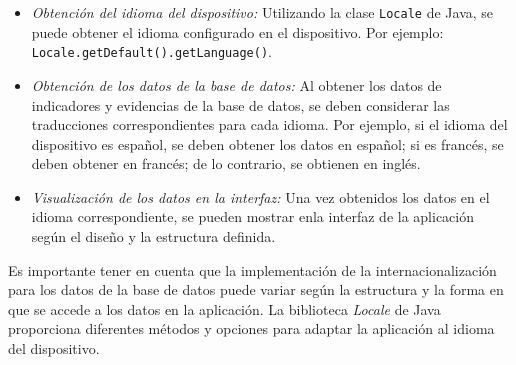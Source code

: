 \begin{itemize}
\begin{itemize}
    \item \textit{Obtención del idioma del dispositivo:} Utilizando la clase \texttt{Locale} de
    Java, se puede obtener el idioma configurado en el dispositivo. Por ejemplo:
    \texttt{Locale.getDefault().getLanguage()}.
    \item \textit{Obtención de los datos de la base de datos:} Al obtener los
    datos de indicadores y evidencias de la base de datos, se deben considerar
    las traducciones correspondientes para cada idioma. Por ejemplo, si el
    idioma del dispositivo es español, se deben obtener los datos en español; si
    es francés, se deben obtener en francés; de lo contrario, se obtienen en
    inglés.
    \item \textit{Visualización de los datos en la interfaz:} Una vez obtenidos
    los datos en el idioma correspondiente, se pueden mostrar enla interfaz de
    la aplicación según el diseño y la estructura definida.
\end{itemize}
    
    Es importante tener en cuenta que la implementación de la
    internacionalización para los datos de la base de datos puede variar según
    la estructura y la forma en que se accede a los datos en la aplicación. La
    biblioteca \textit{Locale} de Java proporciona diferentes métodos y opciones para
    adaptar la aplicación al idioma del dispositivo.
    
\end{itemize}





